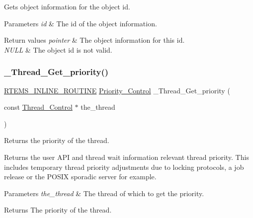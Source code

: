 Gets object information for the object id. 


\begin{DoxyParams}{Parameters}
{\em id} & The id of the object information.\\
\hline
\end{DoxyParams}

\begin{DoxyRetVals}{Return values}
{\em pointer} & The object information for this id. \\
\hline
{\em N\+U\+LL} & The object id is not valid. \\
\hline
\end{DoxyRetVals}
\mbox{\label{group__RTEMSScoreThread_ga3107774ee53fe4ac8323ba4a0f48f8bc}} 
\subsubsection{\texorpdfstring{\_Thread\_Get\_priority()}{\_Thread\_Get\_priority()}}
{\footnotesize\ttfamily \mbox{\hyperlink{group__RTEMSScoreBaseDefs_gac216239df231d5dbd15e3520b0b9313f}{R\+T\+E\+M\+S\+\_\+\+I\+N\+L\+I\+N\+E\+\_\+\+R\+O\+U\+T\+I\+NE}} \mbox{\hyperlink{group__RTEMSScorePriority_ga59d02b58072d31a9a1cfe644557aefe2}{Priority\+\_\+\+Control}} \+\_\+\+Thread\+\_\+\+Get\+\_\+priority (\begin{DoxyParamCaption}\item[{const \mbox{\hyperlink{struct__Thread__Control}{Thread\+\_\+\+Control}} $\ast$}]{the\+\_\+thread }\end{DoxyParamCaption})}



Returns the priority of the thread. 

Returns the user A\+PI and thread wait information relevant thread priority. This includes temporary thread priority adjustments due to locking protocols, a job release or the P\+O\+S\+IX sporadic server for example.


\begin{DoxyParams}{Parameters}
{\em the\+\_\+thread} & The thread of which to get the priority.\\
\hline
\end{DoxyParams}
\begin{DoxyReturn}{Returns}
The priority of the thread. 
\end{DoxyReturn}
\mbox{\label{group__RTEMSScoreThread_ga6fe9824bbef3afafec8782dc3d95b6ce}} 
